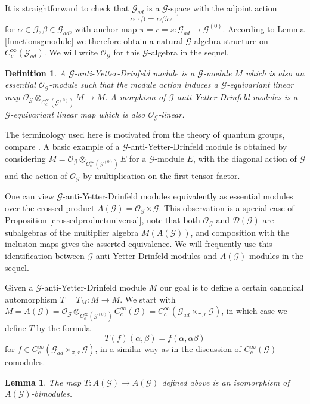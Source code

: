 \documentclass{amsart}
\newtheorem{dfn}[thm]{Definition}
\newtheorem{lemma}[thm]{Lemma}
\newcommand{\G}{\mathcal{G}}
\newcommand{\DG}{\mathcal{D}(\mathcal{G})}
\newcommand{\OG}{\mathcal{O}_{\mathcal{G}}}
\newcommand{\ccinfty}{C_c^\infty}
\begin{document}
It is straightforward to check that $ \G_{ad} $ is a $ \G $-space with the adjoint action 
$$
\alpha \cdot \beta = \alpha \beta \alpha^{-1}
$$
for $ \alpha \in \G, \beta \in \G_{ad} $, with anchor map $ \pi = r = s: \G_{ad} \rightarrow \G^{(0)} $. According to Lemma \ref{functionsgmodule} we therefore obtain a natural $ \G $-algebra structure on $ \ccinfty(\G_{ad}) $. We will write $ \OG $ for this $ \G $-algebra in the sequel. 

\begin{dfn}
A $ \G $-anti-Yetter-Drinfeld module is a $ \G $-module $ M $ which is also an essential $ \OG $-module such that the module action induces a $ \G $-equivariant linear map $ \OG \otimes_{\ccinfty(\G^{(0)})} M \rightarrow M $. A morphism of $ \G $-anti-Yetter-Drinfeld modules is a $ \G $-equivariant linear map which is also $ \OG $-linear. 
\end{dfn}

The terminology used here is motivated from the theory of quantum groups, compare \cite{VOIGT_equivariantperiodiccyclicquantum}. 
A basic example of a $ \G $-anti-Yetter-Drinfeld module is obtained by considering $ M = \OG \otimes_{\ccinfty(\G^{(0)})} E $ for a $ \G $-module $ E $, with the diagonal action of $ \G $ and the action of $ \OG $ by multiplication on the first tensor factor. 

One can view $ \G $-anti-Yetter-Drinfeld modules equivalently as essential modules over the crossed product $ A(\G) = \OG \rtimes \G $. This observation is a special case of Proposition \ref{crossedproductuniversal}, note that both $ \OG $ and $ \DG $ are subalgebras of the multiplier algebra $ M(A(\G)) $, and composition with the inclusion maps gives the asserted equivalence. We will frequently use this identification between $ \G $-anti-Yetter-Drinfeld modules and $ A(\G) $-modules in the sequel. 

Given a $ \G $-anti-Yetter-Drinfeld module $ M $ our goal is to define a certain canonical automorphism $ T = T_M: M \rightarrow M $. We start with $ M = A(\G) = \OG \otimes_{\ccinfty(\G^{(0)})} \ccinfty(\G) = \ccinfty(\G_{ad} \times_{\pi, r} \G) $, in which case we define $ T $ by the formula 
$$
T(f)(\alpha, \beta) = f(\alpha, \alpha \beta)
$$
for $ f \in \ccinfty(\G_{ad} \times_{\pi, r} \G) $, in a similar way as in the discussion of $ \ccinfty(\G) $-comodules. 

\begin{lemma} \label{Tlemma}
The map $ T: A(\G) \rightarrow A(\G) $ defined above is an isomorphism of $ A(\G) $-bimodules. 
\end{lemma} 
\end{document}

